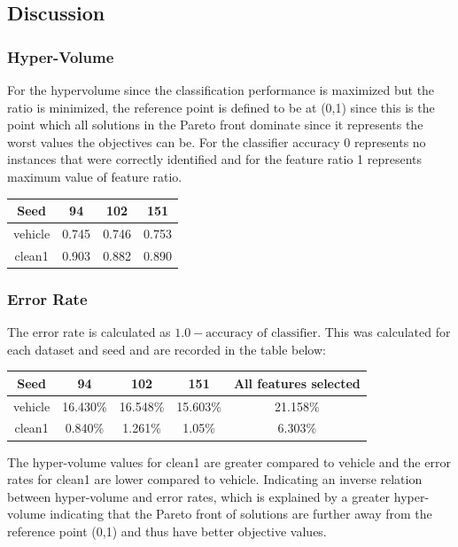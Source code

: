\documentclass{article}
\begin{document}
\subsection*{Discussion}
\subsubsection*{Hyper-Volume}
For the hypervolume since the classification performance is maximized but the ratio is minimized, the reference point is defined to be at (0,1) since this is the point which all solutions in the Pareto front dominate since it represents the worst values the objectives can be. For the classifier accuracy 0 represents no instances that were correctly identified and for the feature ratio 1 represents maximum value of feature ratio. 
\begin{center}
\begin{tabular}{|c|c|c|c|}
\hline
Seed & 94 & 102 & 151 \\
\hline
vehicle & 0.745 & 0.746 & 0.753 \\
\hline
clean1 & 0.903 & 0.882 & 0.890 \\
\hline
\end{tabular}
\end{center}
\subsubsection*{Error Rate}
The error rate is calculated as $1.0 - \text{accuracy of classifier}$. This was calculated for each dataset and seed and are recorded in the table below: 
\begin{center}
\begin{tabular}{|c|c|c|c|c|}
\hline
Seed & 94 & 102 & 151 & All features selected\\
\hline
vehicle & 16.430\% & 16.548\% & 15.603\% & 21.158\%\\
\hline
clean1 & 0.840\% & 1.261\% & 1.05\% & 6.303\% \\
\hline
\end{tabular}
\end{center}
The hyper-volume values for clean1 are greater compared to vehicle and the error rates for clean1 are lower compared to vehicle. Indicating an inverse relation between hyper-volume and error rates, which is explained by a greater hyper-volume indicating that the Pareto front of solutions are further away from the reference point (0,1) and thus have better objective values.  
\end{document}
